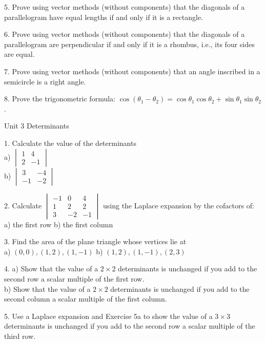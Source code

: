 \documentclass{article}
\begin{document}
5. Prove using vector methods (without components) that the diagonals of a
parallelogram have equal lengths if and only if it is a rectangle.

6. Prove using vector methods (without components) that the diagonals of a
parallelogram are perpendicular if and only if it is a rhombus, i.e., its four
sides are equal.

7. Prove using vector methods (without components) that an angle inscribed in
a semicircle is a right angle.

8. Prove the trigonometric formula: $\cos(\theta_{1} - \theta_{2}) =
\cos\theta_{1}\cos\theta_{2} + \sin\theta_{1}\sin\theta_{2}$.

\bigskip

Unit 3 Determinants

1. Calculate the value of the determinants\\
a) $\begin{vmatrix}
    1 & 4 \\
    2 & -1
\end{vmatrix}$\\
b) $\begin{vmatrix}
    3 & -4 \\
    -1 & -2
\end{vmatrix}$

2. Calculate $\begin{vmatrix}
    -1 & 0 & 4 \\
    1 & 2 & 2 \\
    3 & -2 & -1
\end{vmatrix}$ using the Laplace expansion by the cofactors of:\\
a) the first row \hspace{10px} b) the first column

3. Find the area of the plane triangle whose vertices lie at\\
a) $(0, 0), (1, 2), (1, -1)$ \hspace{10px} b) $(1, 2), (1, -1), (2, 3)$

4. a) Show that the value of a $2 \times 2$ determinants is unchanged if you add
to the second row a scalar multiple of the first row.\\
   b) Show that the value of a $2 \times 2$ determinants is unchanged if you add
to the second column a scalar multiple of the first column.

5. Use a Laplace expansion and Exercise 5a to show the value of a $3 \times 3$
determinants is unchanged if you add to the second row a scalar multiple of the
third row.
\end{document}
